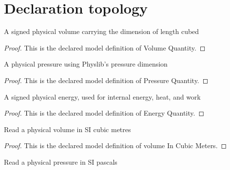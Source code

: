 \section{Declaration topology}
\begin{definition}
  \label{def:physics:phyx-mini-0433:phyxminiproblems-problemphyxmini0433-volumequantity}
  A signed physical volume carrying the dimension of length cubed
\end{definition}
\begin{proof}
  This is the declared model definition of Volume Quantity.
\end{proof}
\begin{definition}
  \label{def:physics:phyx-mini-0433:phyxminiproblems-problemphyxmini0433-pressurequantity}
  A physical pressure using Physlib's pressure dimension
\end{definition}
\begin{proof}
  This is the declared model definition of Pressure Quantity.
\end{proof}
\begin{definition}
  \label{def:physics:phyx-mini-0433:phyxminiproblems-problemphyxmini0433-energyquantity}
  A signed physical energy, used for internal energy, heat, and work
\end{definition}
\begin{proof}
  This is the declared model definition of Energy Quantity.
\end{proof}
\begin{definition}
  \label{def:physics:phyx-mini-0433:phyxminiproblems-problemphyxmini0433-volumeincubicmeters}
  Read a physical volume in SI cubic metres
\end{definition}
\begin{proof}
  This is the declared model definition of volume In Cubic Meters.
\end{proof}
\begin{definition}
  \label{def:physics:phyx-mini-0433:phyxminiproblems-problemphyxmini0433-pressureinpascals}
  Read a physical pressure in SI pascals
\end{definition}

